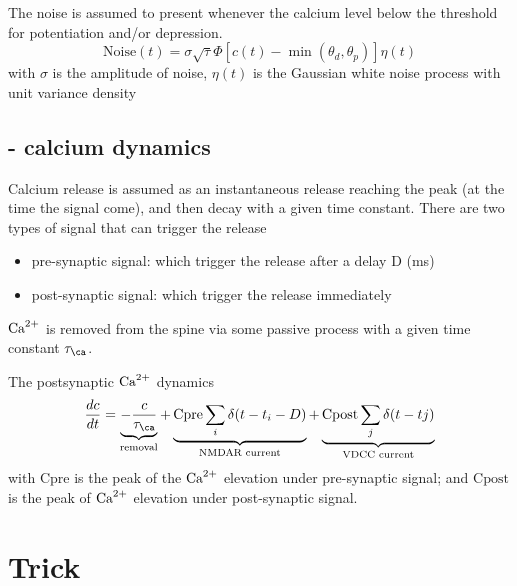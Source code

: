 \begin{itemize}
\begin{mdframed}
  The noise is assumed to present whenever the calcium level below the threshold
  for potentiation and/or depression.
  \begin{equation}
  \text{Noise}(t) = \sigma \sqrt{\tau}\Phi[c(t) - \min(\theta_d,
  \theta_p)]\eta(t)
  \end{equation}
  with $\sigma$ is the amplitude of noise, $\eta(t)$ is the Gaussian white noise
  process with unit variance density
\end{mdframed}

\end{itemize}

\subsection{- calcium dynamics}

Calcium release is assumed as an instantaneous release reaching the
peak (at the time the signal come), and then decay with a given time constant.
There are two types of signal that can trigger the release
\begin{itemize}
  \item pre-synaptic signal: which trigger the release after a delay D (ms)
  
  \item post-synaptic signal: which trigger the release immediately
\end{itemize} 

${\text{Ca}^{2+}}$ is removed from the spine via some passive process with a given time
constant $\tau_\ca$.

\def\Cpre{{\text{Cpre}}}
\def\Cpost{{\text{Cpost}}}

The postsynaptic ${\text{Ca}^{2+}}$ dynamics
 \begin{equation}
 \frac{dc}{dt} = \underbrace{- \frac{c}{\tau_\ca}}_{\text{removal}} +
   \underbrace{\Cpre \sum_i \delta(t - t_i - D)}_{\text{NMDAR current}} +
   \underbrace{\Cpost\sum_j \delta(t-tj)}_{\text{VDCC current}}
 \end{equation} 
 with $\Cpre$ is the peak of the ${\text{Ca}^{2+}}$ elevation under pre-synaptic signal; and
$\Cpost$ is the peak of ${\text{Ca}^{2+}}$ elevation under post-synaptic signal.


 \section{Trick}
 
